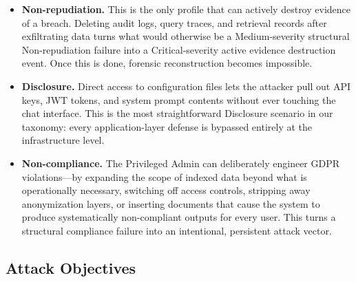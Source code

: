 \documentclass[a4paper,12pt]{report}
\begin{document}
\begin{prosebox}
\begin{itemize}[leftmargin=1.4em, itemsep=5pt]
  \item \textbf{Non-repudiation.} This is the only profile that can
        actively destroy evidence of a breach. Deleting audit logs, query
        traces, and retrieval records after exfiltrating data turns what
        would otherwise be a Medium-severity structural Non-repudiation
        failure into a Critical-severity active evidence destruction event.
        Once this is done, forensic reconstruction becomes impossible.

  \item \textbf{Disclosure.} Direct access to configuration files lets the
        attacker pull out API keys, JWT tokens, and system prompt contents
        without ever touching the chat interface. This is the most
        straightforward Disclosure scenario in our taxonomy: every
        application-layer defense is bypassed entirely at the infrastructure
        level.

  \item \textbf{Non-compliance.} The Privileged Admin can deliberately
        engineer GDPR violations---by expanding the scope of indexed data
        beyond what is operationally necessary, switching off access controls,
        stripping away anonymization layers, or inserting documents that cause
        the system to produce systematically non-compliant outputs for every
        user. This turns a structural compliance failure into an intentional,
        persistent attack vector.
\end{itemize}
\end{prosebox}

\subsection{Attack Objectives}
\end{document}
